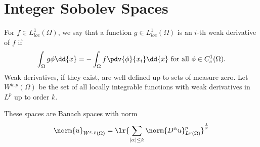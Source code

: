 \documentclass[../main.tex]{subfiles}
\begin{document}
\section{Integer Sobolev Spaces}


\begin{definition}
    For $ f\in L^{1}_{loc}(\Omega) $, we say that a function $ g\in L^{1}_{loc}(\Omega) $ is an $ i $-th weak derivative of $ f $ if 
    \[
        \int_{\Omega} g \phi \dd{x} = -\int_{\Omega} f \pdv{\phi}{x_{i}} \dd{x} \text{ for all } \phi\in C_{c}^{1}(\Omega).
    \]
    Weak derivatives, if they exist, are well defined up to sets of measure zero. Let $ W^{k,p}(\Omega) $ be the set of all locally integrable functions with weak derivatives in $ L^p $ up to order $ k $.

    These spaces are Banach spaces with norm
    \[
        \norm{u}_{W^{k,p}(\Omega)} = \lr{\sum_{| \alpha|\leq k}\norm{D^{\alpha}u}_{L^{p}(\Omega)}^{p}}^{\frac{1}{p}}
    \]
\end{definition}
\end{document}
